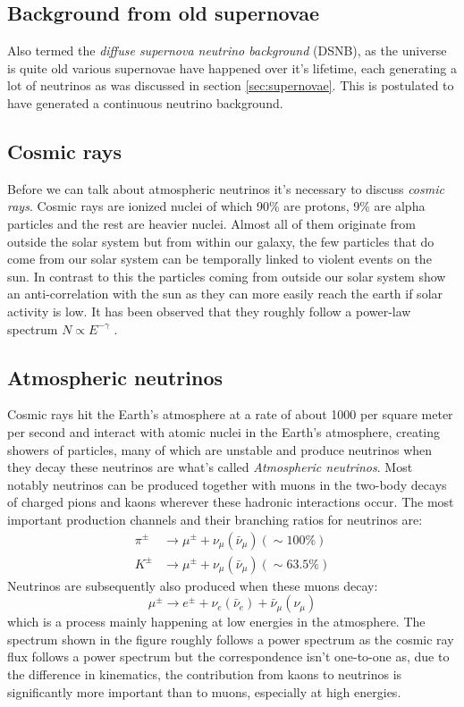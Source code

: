 \documentclass[11pt,a4paper,faculty=we,language=en,doctype=report]{cls/ugent-doc}
\begin{document}
\subsection{Background from old supernovae}
Also termed the \textit{diffuse supernova neutrino background} (DSNB), as the
universe is quite old various supernovae have happened over it's lifetime, each generating
a lot of neutrinos as was discussed in section \ref{sec:supernovae}. 
This is postulated to have generated a continuous neutrino background.
\subsection{Cosmic rays}
Before we can talk about atmospheric neutrinos it's necessary to discuss \textit{cosmic rays}.
Cosmic rays are ionized nuclei of which 90\% are protons, 9\% are alpha particles and
the rest are heavier nuclei. Almost all of them originate from outside the solar system but
from within our galaxy, the few particles that do come from our solar system can be temporally
linked to violent events on the sun. In contrast to this the particles coming from outside
our solar system show an anti-correlation with the sun as they can more easily reach the earth
if solar activity is low.
It has been observed that they roughly follow a power-law spectrum 
$N \propto E^{-\gamma}$ \cite{gaisser_engel_resconi_2016}.
\subsection{Atmospheric neutrinos}
\label{sec:AtmosphericNeutrinos}
Cosmic rays hit the Earth's atmosphere at a rate of about 1000 per square meter
per second and interact with atomic nuclei in the Earth's atmosphere, creating
showers of particles, many of which are unstable and produce neutrinos when
they decay these neutrinos are what's called \textit{Atmospheric neutrinos}.
Most notably neutrinos can be produced together with muons in the two-body
decays of charged pions and kaons wherever these hadronic interactions occur.
The most important production channels and their branching ratios for neutrinos
are:
\begin{align}
	\pi^\pm &\rightarrow \mu^\pm + \nu_\mu(\bar{\nu}_\mu) (\sim 100\%)\\
	K^\pm &\rightarrow \mu^\pm + \nu_\mu(\bar{\nu}_\mu) (\sim 63.5\%)
\end{align}
Neutrinos are subsequently also produced when these muons decay:
\begin{equation}
	\mu^\pm \rightarrow e^\pm + \nu_e(\bar{\nu}_e) + \bar{\nu}_\mu(\nu_\mu)
\end{equation}
which is a process mainly happening
at low energies in the atmosphere.
The spectrum shown in the figure roughly follows a power spectrum as the
cosmic ray flux follows a power spectrum but the correspondence isn't one-to-one
as, due to the difference in kinematics, the contribution from kaons to neutrinos is 
significantly more important than to muons, especially at high energies.
\end{document}
